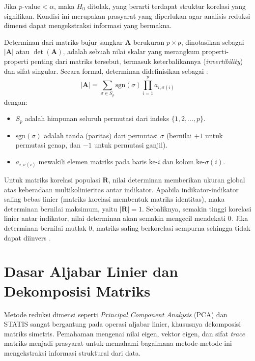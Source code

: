 Jika $p\text{-value} < \alpha$, maka $H_0$ ditolak, yang berarti terdapat struktur korelasi yang signifikan. Kondisi ini merupakan prasyarat yang diperlukan agar analisis reduksi dimensi dapat mengekstraksi informasi yang bermakna.

\begin{definition}
  Determinan dari matriks bujur sangkar $\mathbf{A}$ berukuran $p \times p$, dinotasikan sebagai $|\mathbf{A}|$ atau $\det(\mathbf{A})$, adalah sebuah nilai skalar yang merangkum properti-properti penting dari matriks tersebut, termasuk keterbalikannya (\textit{invertibility}) dan sifat singular. Secara formal, determinan didefinisikan sebagai \citep{anton2013}:
  \begin{equation}
    |\mathbf{A}| = \sum_{\sigma \in S_p} \text{sgn}(\sigma) \prod_{i=1}^{p} a_{i,\sigma(i)}
  \end{equation}
  dengan:
  \begin{itemize}
      \item $S_p$ adalah himpunan seluruh permutasi dari indeks $\{1, 2, \ldots, p\}$.
      \item $\text{sgn}(\sigma)$ adalah tanda (paritas) dari permutasi $\sigma$ (bernilai $+1$ untuk permutasi genap, dan $-1$ untuk permutasi ganjil).
      \item $a_{i,\sigma(i)}$ mewakili elemen matriks pada baris ke-$i$ dan kolom ke-$\sigma(i)$.
  \end{itemize}
  Untuk matriks korelasi populasi $\mathbf{R}$, nilai determinan memberikan ukuran global atas keberadaan multikolinieritas antar indikator. Apabila indikator-indikator saling bebas linier (matriks korelasi membentuk matriks identitas), maka determinan bernilai maksimum, yaitu $|\mathbf{R}| = 1$. Sebaliknya, semakin tinggi korelasi linier antar indikator, nilai determinan akan semakin mengecil mendekati 0. Jika determinan bernilai mutlak 0, matriks saling berkorelasi sempurna sehingga tidak dapat diinvers \citep{johnson2007}.
\end{definition}

\section{\normalsize Dasar Aljabar Linier dan Dekomposisi Matriks}

Metode reduksi dimensi seperti \textit{Principal Component Analysis} (PCA) dan STATIS sangat bergantung pada operasi aljabar linier, khususnya dekomposisi matriks simetris. Pemahaman mengenai nilai eigen, vektor eigen, dan sifat \textit{trace} matriks menjadi prasyarat untuk memahami bagaimana metode-metode ini mengekstraksi informasi struktural dari data.

